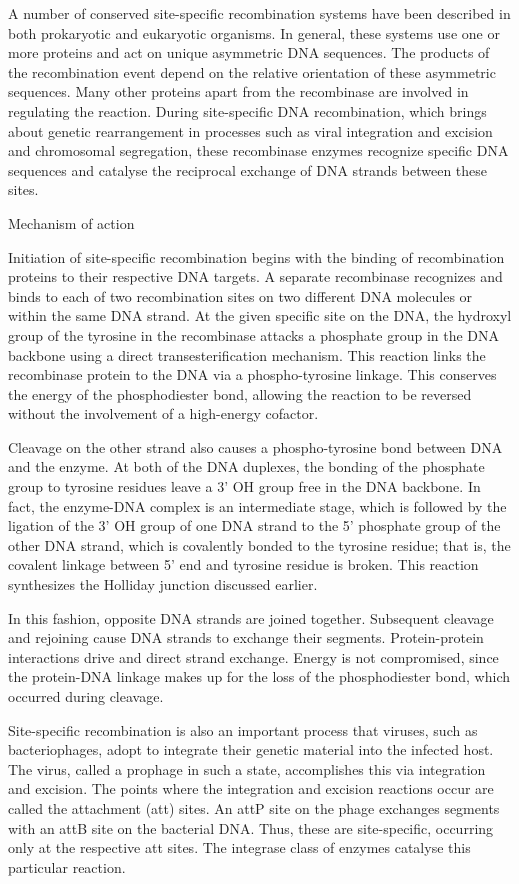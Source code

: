 A number of conserved site-specific recombination systems have been described in both prokaryotic and eukaryotic organisms. In general, these systems use one or more proteins and act on unique asymmetric DNA sequences. The products of the recombination event depend on the relative orientation of these asymmetric sequences. Many other proteins apart from the recombinase are involved in regulating the reaction. During site-specific DNA recombination, which brings about genetic rearrangement in processes such as viral integration and excision and chromosomal segregation, these recombinase enzymes recognize specific DNA sequences and catalyse the reciprocal exchange of DNA strands between these sites.

Mechanism of action

Initiation of site-specific recombination begins with the binding of recombination proteins to their respective DNA targets. A separate recombinase recognizes and binds to each of two recombination sites on two different DNA molecules or within the same DNA strand. At the given specific site on the DNA, the hydroxyl group of the tyrosine in the recombinase attacks a phosphate group in the DNA backbone using a direct transesterification mechanism. This reaction links the recombinase protein to the DNA via a phospho-tyrosine linkage. This conserves the energy of the phosphodiester bond, allowing the reaction to be reversed without the involvement of a high-energy cofactor.

Cleavage on the other strand also causes a phospho-tyrosine bond between DNA and the enzyme. At both of the DNA duplexes, the bonding of the phosphate group to tyrosine residues leave a 3' OH group free in the DNA backbone. In fact, the enzyme-DNA complex is an intermediate stage, which is followed by the ligation of the 3' OH group of one DNA strand to the 5' phosphate group of the other DNA strand, which is covalently bonded to the tyrosine residue; that is, the covalent linkage between 5' end and tyrosine residue is broken. This reaction synthesizes the Holliday junction discussed earlier.

In this fashion, opposite DNA strands are joined together. Subsequent cleavage and rejoining cause DNA strands to exchange their segments. Protein-protein interactions drive and direct strand exchange. Energy is not compromised, since the protein-DNA linkage makes up for the loss of the phosphodiester bond, which occurred during cleavage.

Site-specific recombination is also an important process that viruses, such as bacteriophages, adopt to integrate their genetic material into the infected host. The virus, called a prophage in such a state, accomplishes this via integration and excision. The points where the integration and excision reactions occur are called the attachment (att) sites. An attP site on the phage exchanges segments with an attB site on the bacterial DNA. Thus, these are site-specific, occurring only at the respective att sites. The integrase class of enzymes catalyse this particular reaction.

